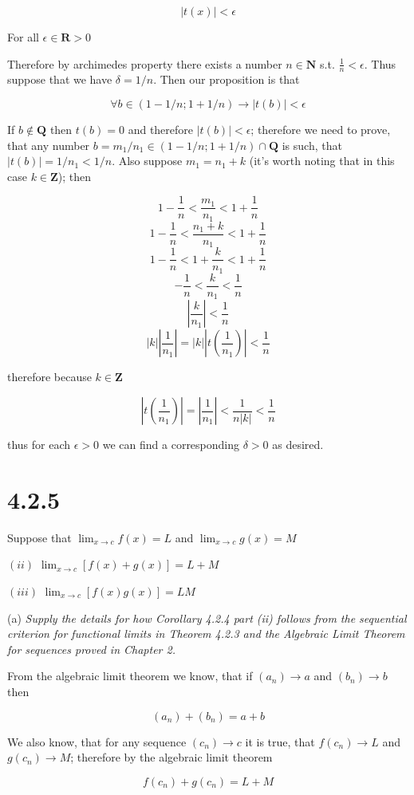 \documentclass[11pt,oneside,titlepage]{article}
\begin{document}
$$ |t(x)| < \epsilon$$

For all $\epsilon \in \textbf{R} > 0$

Therefore by archimedes property there exists a number $n \in \textbf{N}$ s.t. $\frac{1}{n} < \epsilon$.
Thus suppose that we have $\delta = 1/n$. Then our proposition is that 

$$\forall b \in (1 - 1/n; 1 + 1/n) \to |t(b)| < \epsilon$$

If $b \notin \textbf{Q} $ then $t(b) = 0$ and therefore $|t(b)| < \epsilon$; therefore we need to prove,
that any number $b = m_1/n_1 \in (1 - 1/n; 1 + 1/n) \cap \textbf{Q}$ is such, that $|t(b)| = 1/n_1 < 1/n$.
Also suppose $m_1 = n_1 + k$ (it's worth noting that in this case $k \in \textbf{Z}$); then

$$ 1 - \frac{1}{n} < \frac{m_1}{n_1} < 1 + \frac{1}{n}$$
$$ 1 - \frac{1}{n} < \frac{n_1 + k}{n_1} < 1 + \frac{1}{n}$$
$$ 1 - \frac{1}{n} < 1 + \frac{k}{n_1} < 1 + \frac{1}{n}$$
$$ - \frac{1}{n} <  \frac{k}{n_1} <  \frac{1}{n}$$
$$ |\frac{k}{n_1}| <  \frac{1}{n}$$
$$ |k||\frac{1}{n_1}| = |k||t(\frac{1}{n_1})| <  \frac{1}{n}$$

therefore because $k \in \textbf{Z}$

$$ |t(\frac{1}{n_1})| = |\frac{1}{n_1}| <  \frac{1}{n|k|} < \frac{1}{n}$$

thus for each $\epsilon > 0$ we can find a corresponding $\delta > 0$ as desired.

\section*{4.2.5}
Suppose that $\lim_{x \to c} f(x) = L$ and $\lim_{x \to c} g(x) = M$

$(ii)$ $\lim_{x \to c}[f(x) + g(x)] = L + M$

$(iii)$ $\lim_{x \to c}[f(x) g(x)] = L M$

(a)\textit{ Supply the details for how Corollary 4.2.4 part (ii) follows from the sequential criterion for functional limits in Theorem 4.2.3 and the Algebraic Limit Theorem for sequences proved in Chapter 2.}

From the algebraic limit theorem we know, that if $(a_n) \to a$ and $(b_n) \to b$ then

$$(a_n) + (b_n) = a + b$$

We also know, that for any sequence $(c_n) \to c$ it is true, that $f(c_n) \to L$ and $g(c_n) \to M$;
therefore by the algebraic limit theorem

$$f(c_n) + g(c_n) = L + M$$
\end{document}
